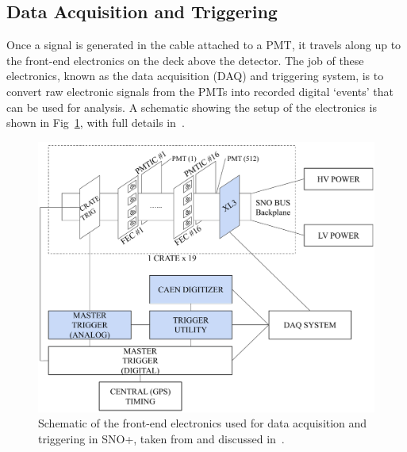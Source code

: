 \subsection{Data Acquisition and Triggering}\label{sec:daq}
Once a signal is generated in the cable attached to a PMT, it travels along up to the front-end electronics on the deck above the detector. The job of these electronics, known as the data acquisition (DAQ) and triggering system, is to convert raw electronic signals from the PMTs into recorded digital `events' that can be used for analysis. A schematic showing the setup of the electronics is shown in Fig~\ref{fig:tdaq_schematic}, with full details in~\cite{albaneseSNOExperiment2021}. %

\begin{figure}
    \centering
    \includegraphics[width=0.8\linewidth]{2_Detector/Figs/electronics_diagram.pdf}
    \caption[Schematic of the front-end electronics used for data acquisition and triggering in SNO+]{Schematic of the front-end electronics used for data acquisition and triggering in SNO+, taken from and discussed in~\cite{albaneseSNOExperiment2021}. %
    }
    \label{fig:tdaq_schematic}
\end{figure}

